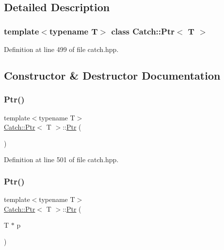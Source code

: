 \subsection{Detailed Description}
\subsubsection*{template$<$typename T$>$\newline
class Catch\+::\+Ptr$<$ T $>$}



Definition at line 499 of file catch.\+hpp.



\subsection{Constructor \& Destructor Documentation}
\hypertarget{class_catch_1_1_ptr_a6108f0195595ee9d7a411daea810beaf}{}\label{class_catch_1_1_ptr_a6108f0195595ee9d7a411daea810beaf} 
\subsubsection{\texorpdfstring{Ptr()}{Ptr()}\hspace{0.1cm}{\footnotesize\ttfamily [1/3]}}
{\footnotesize\ttfamily template$<$typename T$>$ \\
\hyperlink{class_catch_1_1_ptr}{Catch\+::\+Ptr}$<$ T $>$\+::\hyperlink{class_catch_1_1_ptr}{Ptr} (\begin{DoxyParamCaption}{ }\end{DoxyParamCaption})\hspace{0.3cm}{\ttfamily [inline]}}



Definition at line 501 of file catch.\+hpp.

\hypertarget{class_catch_1_1_ptr_aacec063a79cd142e39040a31c6b3c40b}{}\label{class_catch_1_1_ptr_aacec063a79cd142e39040a31c6b3c40b} 
\subsubsection{\texorpdfstring{Ptr()}{Ptr()}\hspace{0.1cm}{\footnotesize\ttfamily [2/3]}}
{\footnotesize\ttfamily template$<$typename T$>$ \\
\hyperlink{class_catch_1_1_ptr}{Catch\+::\+Ptr}$<$ T $>$\+::\hyperlink{class_catch_1_1_ptr}{Ptr} (\begin{DoxyParamCaption}\item[{T $\ast$}]{p }\end{DoxyParamCaption})\hspace{0.3cm}{\ttfamily [inline]}}



